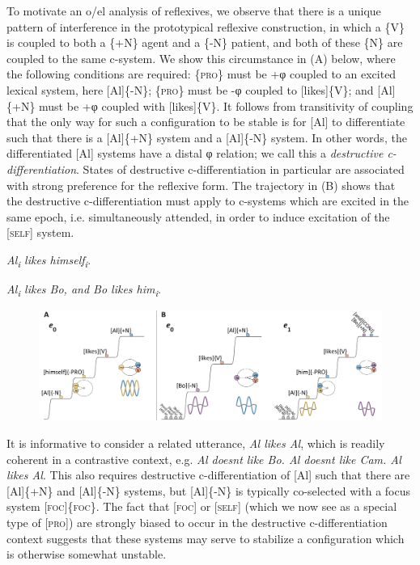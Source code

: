   To motivate an o/el analysis of reflexives, we observe that there is a unique pattern of interference in the prototypical reflexive construction, in which a \{V\} is coupled to both a \{+N\} agent and a \{-N\} patient, and both of these \{N\} are coupled to the same c-system. We show this circumstance in (A) below, where the following conditions are required: \{\textsc{pro}\} must be +φ coupled to an excited lexical system, here [Al]\{-N\}; \{\textsc{pro}\} must be -φ coupled to [likes]\{V\}; and [Al]\{+N\} must be +φ coupled with [likes]\{V\}. It follows from transitivity of coupling that the only way for such a configuration to be stable is for [Al] to differentiate such that there is a [Al]\{+N\} system and a [Al]\{-N\} system. In other words, the differentiated [Al] systems have a distal φ relation; we call this a \textit{destructive c-differentiation}. States of destructive c-differentiation in particular are associated with strong preference for the reflexive form. The trajectory in (B) shows that the destructive c-differentiation must apply to c-systems which are excited in the same epoch, i.e. simultaneously attended, in order to induce excitation of the [\textsc{self}] system. 

    \textit{Al\textsubscript{i} likes himself\textsubscript{i}}.  

    \textit{Al\textsubscript{i} likes Bo, and Bo likes him\textsubscript{i}}.  

  
\begin{figure}
\includegraphics[width=\textwidth]{figures/Tilsen-img156.png}
\caption{\missingcaption}
\label{fig:}
\end{figure}
 

  It is informative to consider a related utterance, \textit{Al likes Al}, which is readily coherent in a contrastive context, e.g. \textit{Al doesnt like Bo. Al doesnt like Cam. Al likes Al}. This also requires destructive c-differentiation of [Al] such that there are [Al]\{+N\} and [Al]\{-N\} systems, but [Al]\{-N\} is typically co-selected with a focus system [\textsc{foc}]\{\textsc{foc}\}. The fact that [\textsc{foc}] or [\textsc{self}] (which we now see as a special type of [\textsc{pro}]) are strongly biased to occur in the destructive c-differentiation context suggests that these systems may serve to stabilize a configuration which is otherwise somewhat unstable.

